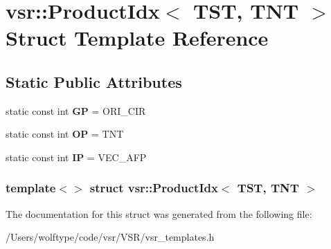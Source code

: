 \hypertarget{structvsr_1_1_product_idx_3_01_t_s_t_00_01_t_n_t_01_4}{\section{vsr\-:\-:Product\-Idx$<$ T\-S\-T, T\-N\-T $>$ Struct Template Reference}
\label{structvsr_1_1_product_idx_3_01_t_s_t_00_01_t_n_t_01_4}
}
\subsection*{Static Public Attributes}
\begin{DoxyCompactItemize}
\item 
\hypertarget{structvsr_1_1_product_idx_3_01_t_s_t_00_01_t_n_t_01_4_aaa402735e5160f41950056a7ef6bcaed}{static const int {\bfseries G\-P} = O\-R\-I\-\_\-\-C\-I\-R}\label{structvsr_1_1_product_idx_3_01_t_s_t_00_01_t_n_t_01_4_aaa402735e5160f41950056a7ef6bcaed}

\item 
\hypertarget{structvsr_1_1_product_idx_3_01_t_s_t_00_01_t_n_t_01_4_a02bcc5e340433d0adff3421ccdf48c8a}{static const int {\bfseries O\-P} = T\-N\-T}\label{structvsr_1_1_product_idx_3_01_t_s_t_00_01_t_n_t_01_4_a02bcc5e340433d0adff3421ccdf48c8a}

\item 
\hypertarget{structvsr_1_1_product_idx_3_01_t_s_t_00_01_t_n_t_01_4_a09f2f0a4d0d2d5199ae1f1112462a630}{static const int {\bfseries I\-P} = V\-E\-C\-\_\-\-A\-F\-P}\label{structvsr_1_1_product_idx_3_01_t_s_t_00_01_t_n_t_01_4_a09f2f0a4d0d2d5199ae1f1112462a630}

\end{DoxyCompactItemize}
\subsubsection*{template$<$$>$ struct vsr\-::\-Product\-Idx$<$ T\-S\-T, T\-N\-T $>$}



The documentation for this struct was generated from the following file\-:\begin{DoxyCompactItemize}
\item 
/\-Users/wolftype/code/vsr/\-V\-S\-R/vsr\-\_\-templates.\-h\end{DoxyCompactItemize}
